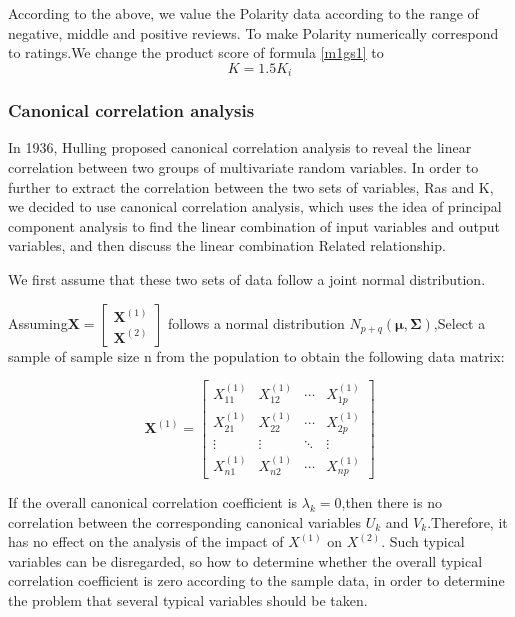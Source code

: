 \documentclass{mcmthesis}
\newcommand{\upcite}[1]{\textsuperscript{\textsuperscript{\cite{#1}}}}
\begin{document}
According to the above, we value the Polarity data according to the range of negative, middle and positive reviews. To make Polarity numerically correspond to ratings.We change the product score of formula \ref{m1gs1}  to
\begin{equation}\label{q5gs1}
K=1.5K_i
\end{equation}

\subsubsection*{Canonical correlation analysis}

In 1936, Hulling proposed canonical correlation analysis to reveal the linear correlation between two groups of multivariate random variables. In order to further to extract the correlation between the two sets of variables, Ras and K, we decided to use canonical correlation analysis, which uses the idea of principal component analysis to find the linear combination of input variables and output variables, and then discuss the linear combination Related relationship. \upcite{jj}

We first assume that these two sets of data follow a joint normal distribution.

Assuming\(\mathbf{X}=\left[\begin{array}{l}
\mathbf{X}^{(1)} \\
\mathbf{X}^{(2)}
\end{array}\right]\) follows a normal distribution \(N_{p+q}(\boldsymbol{\mu}, \boldsymbol{\Sigma})\),Select a sample of sample size n from the population to obtain the following data matrix:

\[\mathbf{X}^{(1)}=\left[\begin{array}{cccc}
X_{11}^{(1)} & X_{12}^{(1)} & \cdots & X_{1 p}^{(1)} \\
X_{21}^{(1)} & X_{22}^{(1)} & \cdots & X_{2 p}^{(1)} \\
\vdots & \vdots & \ddots & \vdots \\
X_{n 1}^{(1)} & X_{n 2}^{(1)} & \cdots & X_{n p}^{(1)}
\end{array}\right]\]

If the overall canonical correlation coefficient is \(\lambda_{k}=0\),then there is no correlation between the corresponding canonical variables \(U_{k}\) and \(V_{k}\).Therefore, it has no effect on the analysis of the impact of \(X^{(1)}\) on \(X^{(2)}\). Such typical variables can be disregarded, so how to determine whether the overall typical correlation coefficient is zero according to the sample data, in order to determine the problem that several typical variables should be taken.
\end{document}
